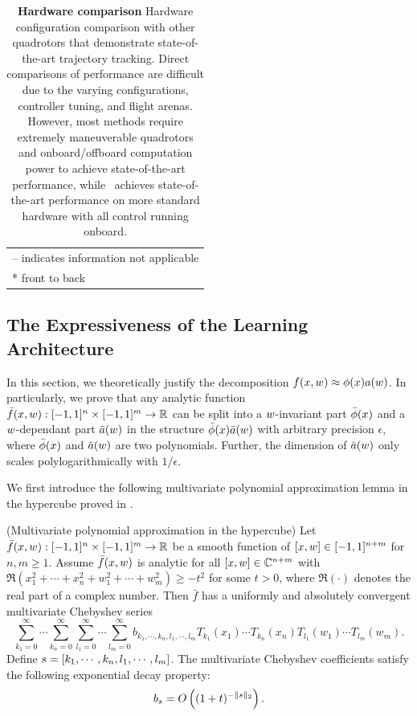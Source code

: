 \begin{table}[ht]
\begin{small}
\begin{tabular}{c|c|c|c|c}
        \multicolumn{5}{l}{-- indicates information not applicable}\\
        \multicolumn{5}{l}{*  front to back}
    \end{tabular}
    \caption{\textbf{Hardware comparison} Hardware configuration comparison with other quadrotors that demonstrate state-of-the-art trajectory tracking. Direct comparisons of performance are difficult due to the varying configurations, controller tuning, and flight arenas. However, most methods require extremely maneuverable quadrotors and onboard/offboard computation power to achieve state-of-the-art performance, while \nf~achieves state-of-the-art performance on more standard hardware with all control running onboard.}
    \label{tab:hardware-comparison}
    \end{small}
\end{table}


\subsection{The Expressiveness of the Learning Architecture}
\label{sec:supp-learning-expressiveness}

In this section, we theoretically justify the decomposition $ f( x, w)\approx \phi( x) a( w)$. In particularly, we prove that any analytic function $\bar{f}( x, w):[-1,1]^n\times[-1,1]^m\rightarrow\mathbb{R}$ can be split into a $ w$-invariant part $\bar{\phi}( x)$ and a $ w$-dependant part $\bar{ a}( w)$ in the structure $\bar{\phi}( x)\bar{ a}( w)$ with arbitrary precision $\epsilon$, where $\bar{\phi}( x)$ and $\bar{ a}( w)$ are two polynomials. Further, the dimension of $\bar{ a}( w)$ only scales polylogarithmically with $1/\epsilon$. 

We first introduce the following multivariate polynomial approximation lemma in the hypercube proved in \cite{trefethen2017multivariate}.
\begin{lemma}(Multivariate polynomial approximation in the hypercube)
\label{lemma:poly_appro}
Let $\bar{f}( x, w):[-1,1]^n\times[-1,1]^m\rightarrow\mathbb{R}$ be a smooth function of $[ x, w]\in[-1,1]^{n+m}$ for $n,m\geq 1$. Assume $\bar{f}( x, w)$ is analytic for all $[ x, w]\in\mathbb{C}^{n+m}$ with $\Re(x_1^2+\cdots+x_n^2+w_1^2+\cdots+w_m^2)\geq-t^2$ for some $t>0$, where $\Re(\cdot)$ denotes the real part of a complex number. Then $\bar{f}$ has a uniformly and absolutely convergent multivariate Chebyshev series 
$$\sum_{k_1=0}^\infty\cdots\sum_{k_n=0}^\infty\sum_{l_1=0}^\infty\cdots\sum_{l_m=0}^\infty
b_{k_1,\cdots,k_n,l_1,\cdots,l_m}T_{k_1}(x_1)\cdots T_{k_n}(x_n)T_{l_1}(w_1)\cdots T_{l_m}(w_m).
$$
Define $ s=[k_1,\cdots,k_n,l_1,\cdots,l_m]$. The multivariate Chebyshev coefficients satisfy the following exponential decay property:
$$b_{s}=O\left( (1+t)^{-\| s\|_2} \right).$$
\end{lemma}

